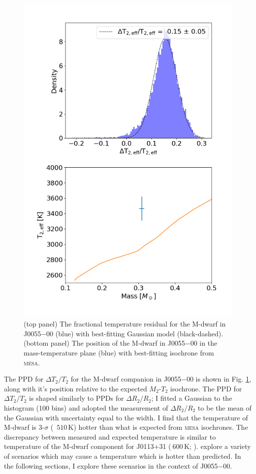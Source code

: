 \begin{figure}
    \centering
    \includegraphics[scale = 0.6]{9-Discussion/images/T2_inflation.png}
    \caption{(top panel) The fractional temperature residual for the M-dwarf in J0055$-$00 (blue) with best-fitting Gaussian model (black-dashed). (bottom panel) The position of the M-dwarf in J0055$-$00 in the mass-temperature plane (blue) with best-fitting isochrone from \textsc{mesa}.}
    \label{discussion:fig:T2_inflation}
\end{figure}

The PPD for $\Delta T_2 / T_2$ for the M-dwarf companion in J0055$-$00 is shown in Fig. \ref{discussion:fig:T2_inflation}, along with it's position relative to the expected $M_2$-$T_{2}$ isochrone.  The PPD for $\Delta T_2 / T_2$ is shaped similarly to PPDs for $\Delta R_2 / R_2$; I fitted a Gaussian to the histogram (100 bins) and adopted the measurement of $\Delta R_2 / R_2$ to be the mean of the Gaussian with uncertainty equal to the width. I find that the temperature of M-dwarf is 3-$\sigma$ (~$510$\,K) hotter than what is expected from \textsc{mesa} isochrones. The discrepancy between measured and expected temperature is similar to temperature of the M-dwarf component for J0113$+$31 ($~ 600$\,K; \citealt{2014A&A...572A..50G}).  \citet{2014A&A...572A..50G} explore a variety of scenarios which may cause a temperature which is hotter than predicted. In the following sections, I explore these scenarios in the context of J0055$-$00.

